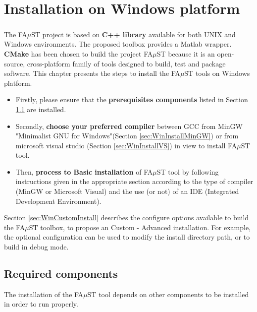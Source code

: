 \chapter{Installation on Windows platform}\label{sec:WinInstall}


\paragraph{}The FA$\mu$ST project is based on \textbf{C++ library} available for both UNIX and Windows environments. The proposed toolbox provides a Matlab wrapper. \textbf{CMake} has been chosen to build the project FA$\mu$ST because it is an open-source, cross-platform family of tools designed to build, test and package software. This chapter presents the steps to install the FA$\mu$ST tools on Windows platform.

\begin{itemize}
\item Firstly, please ensure that the \textbf{prerequisites components} listed in Section \ref{sec:WinRequired} are installed. 

\item Secondly, \textbf{choose your preferred compiler} between GCC from MinGW "Minimalist GNU for Windows"(Section \ref{sec:WinInstallMinGW}) or from microsoft visual studio (Section \ref{sec:WinInstallVS}) in view to install FA$\mu$ST tool. 

\item Then, \textbf{process to Basic installation} of FA$\mu$ST tool by following instructions given in the appropriate section according to the type of compiler (MinGW or Microsoft Visual) and the use (or not) of an IDE (Integrated Development Environment). 
\end{itemize}




Section \ref{sec:WinCustomInstall} describes the configure options available to build the FA$\mu$ST toolbox, to propose an Custom - Advanced installation. For example, the optional configuration can be used to modify the install directory path, or to build in debug mode.  


\section{Required components}\label{sec:WinRequired}
The installation of the FA$\mu$ST tool depends on other components to be installed in order to run properly. 


